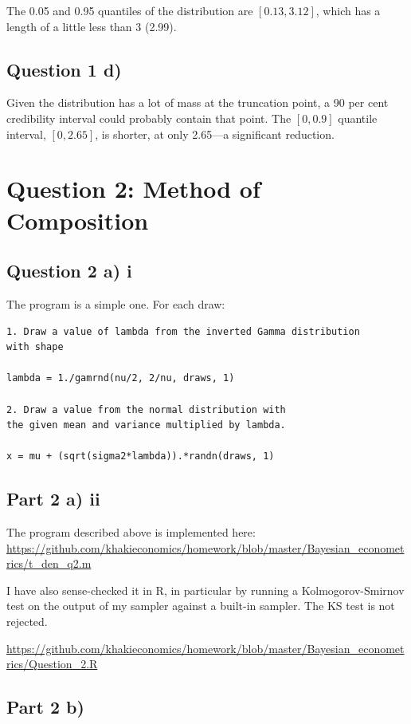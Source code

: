 \documentclass[a4paper,11pt]{article}
\begin{document}
The 0.05 and 0.95 quantiles of the distribution are $[0.13, 3.12]$, which has a length of a little less than 3 (2.99).

\subsection*{Question 1 d)}

Given the distribution has a lot of mass at the truncation point, a 90 per cent credibility interval could probably contain that point. The $[0, 0.9]$ quantile interval, $[0, 2.65]$, is shorter, at only 2.65---a significant reduction.


\section*{Question 2: Method of Composition}

\subsection*{Question 2 a) i}

The program is a simple one. For each draw:

\begin{verbatim}
1. Draw a value of lambda from the inverted Gamma distribution
with shape

lambda = 1./gamrnd(nu/2, 2/nu, draws, 1)

2. Draw a value from the normal distribution with
the given mean and variance multiplied by lambda.

x = mu + (sqrt(sigma2*lambda)).*randn(draws, 1)
\end{verbatim}


\subsection*{Part 2 a) ii}

The program described above is implemented here:
\url{https://github.com/khakieconomics/homework/blob/master/Bayesian_econometrics/t_den_q2.m}

I have also sense-checked it in R, in particular by running a Kolmogorov-Smirnov test on the output of my sampler against a built-in sampler. The KS test is not rejected.

\url{https://github.com/khakieconomics/homework/blob/master/Bayesian_econometrics/Question_2.R}

\subsection*{Part 2 b)}
\end{document}
